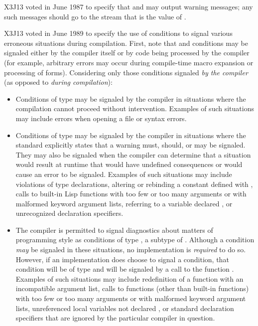 X3J13 voted in June 1987  to specify
that  and 
may output warning messages; any such messages should
go to the stream that is the value of .

X3J13 voted in June 1989 
to specify the use of conditions to signal various erroneous situations
during compilation.
First, note that
 and  conditions may be signaled either by the compiler itself
or by code being processed by the compiler (for example, arbitrary errors may 
    occur during compile-time macro expansion or processing of 
    forms).
Considering only those conditions signaled \emph{by the compiler} (as
    opposed to \emph{during compilation}):
\begin{itemize}

\item   Conditions of type  may be signaled by the compiler in
        situations where the compilation cannot proceed without
        intervention.  Examples of such situations may include errors when opening
        a file or syntax errors.

\item  Conditions of type  may be signaled by the compiler in 
        situations where the standard explicitly states that a warning must,
        should, or may be signaled.  They may also be signaled
        when the compiler can determine 
        that a situation would result at runtime that would have
        undefined consequences or would cause
        an error to be signaled.
        Examples of such situations may include
            violations of type declarations,
            altering or rebinding a constant defined with ,
            calls to built-in Lisp functions with too few or too many arguments
                or with malformed keyword argument lists,
            referring to a variable declared , or
            unrecognized declaration specifiers.

\item  The compiler is permitted to signal diagnostics about matters of
        programming style as conditions of type , a subtype
    of .  Although 
        a  condition \emph{may} be signaled in these situations, no 
        implementation is \emph{required} to do so.  However, if an 
        implementation does choose to signal a condition, that condition 
        will be of type  and will be signaled by a call to 
        the function .
        Examples of such situations may include
            redefinition of a function with an incompatible argument list,
            calls to functions (other than built-in functions)
                with too few or too many arguments
                or with malformed keyword argument lists,
            unreferenced local variables not declared , or
            standard declaration specifiers that are ignored by 
                the particular compiler in question.
\end{itemize}

